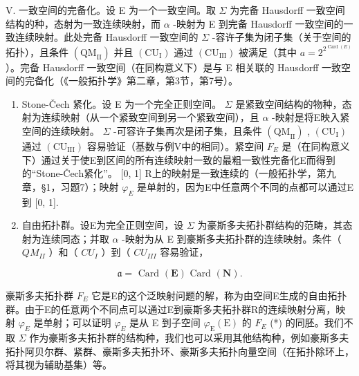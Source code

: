 V. 一致空间的完备化。设 E 为一个一致空间。取 \(\Sigma\) 为完备 Hausdorff 一致空间结构的种，态射为一致连续映射，而 \(\alpha\) -映射为 E 到完备 Hausdorff 一致空间的一致连续映射。此处完备 Hausdorff 一致空间的 \(\Sigma\) -容许子集为闭子集（关于空间的拓扑），且条件 \((\mathrm{QM}_{\mathrm{II}})\) 并且 \((\mathrm{CU}_{\mathrm{I}})\) 通过 \((\mathrm{CU}_{\mathrm{III}})\) 被满足（其中 \(a = 2^{2^{\operatorname{Card}(E)}}\) ）。完备 Hausdorff 一致空间（在同构意义下）是与 E 相关联的 Hausdorff 一致空间的完备化（《一般拓扑学》第二章，第3节，第7号）。

\begin{enumerate}
\def\labelenumi{\Roman{enumi}.}
\setcounter{enumi}{5}
\item
  Stone-Čech 紧化。设 E 为一个完全正则空间。 \(\Sigma\) 是紧致空间结构的物种，态射为连续映射（从一个紧致空间到另一个紧致空间），且 \(\alpha\) -映射是将E映入紧空间的连续映射。 \(\Sigma\) -可容许子集再次是闭子集，且条件 \((\mathrm{QM}_{\mathrm{II}})\) , \((\mathrm{CU}_{\mathrm{I}})\) 通过 \((\mathrm{CU}_{\mathrm{III}})\) 容易验证（基数与例V中的相同）。紧空间 \(F_{E}\) 是（在同构意义下）通过关于使E到区间的所有连续映射一致的最粗一致性完备化E而得到的“Stone-Čech紧化”。 {[}0, 1{]} R上的映射是一致连续的（一般拓扑学，第九章，§1，习题7）；映射 \(\varphi_{E}\) 是单射的，因为E中任意两个不同的点都可以通过E到 {[}0, 1{]}.
\item
  自由拓扑群。设E为完全正则空间，设 \(\Sigma\) 为豪斯多夫拓扑群结构的范畴，其态射为连续同态；并取 \(\alpha\) -映射为从 E 到豪斯多夫拓扑群的连续映射。条件（ \(QM_{II}\) ）和（ \(CU_{I}\) ）到（ \(CU_{III}\) 容易验证，
\end{enumerate}

\[
\mathfrak {a} = \text { Card } (\mathbf {E}) \text { Card } (\mathbf {N}).
\]

豪斯多夫拓扑群 \(F_{E}\) 它是E的这个泛映射问题的解，称为由空间E生成的自由拓扑群。由于E的任意两个不同点可以通过E到豪斯多夫拓扑群R的连续映射分离，映射 \(\varphi_{E}\) 是单射；可以证明 \(\varphi_{E}\) 是从 E 到子空间 \(\varphi_{\mathrm{E}}(\mathrm{E})\) 的 \(F_{E}\) (*) 的同胚。我们不取 \(\Sigma\) 作为豪斯多夫拓扑群的结构种，我们也可以采用其他结构种，例如豪斯多夫拓扑阿贝尔群、紧群、豪斯多夫拓扑环、豪斯多夫拓扑向量空间（在拓扑除环上，将其视为辅助基集）等。

